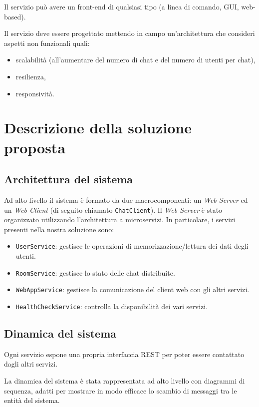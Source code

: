 \documentclass[a4paper]{article}
\begin{document}
Il servizio può avere un front-end di qualsiasi tipo (a linea di comando, GUI, web-based).

Il servizio deve essere progettato mettendo in campo un'architettura che consideri aspetti non funzionali quali:
\begin{itemize}
    \item scalabilità (all'aumentare del numero di chat e del numero di utenti per chat),
    \item resilienza,
    \item responsività.
\end{itemize}

\section{Descrizione della soluzione proposta}\label{soluzione-proposta}

\subsection{Architettura del sistema}\label{architettura-del-sistema}
Ad alto livello il sistema è formato da due macrocomponenti: un \textit{Web Server} ed un \textit{Web Client} (di seguito chiamato \texttt{ChatClient}). 
Il \textit{Web Server} è stato organizzato utilizzando l'architettura a microservizi. In particolare, i servizi presenti nella nostra soluzione sono:
\begin{itemize}
    \item \texttt{UserService}: gestisce le operazioni di memorizzazione/lettura dei dati degli utenti.
    \item \texttt{RoomService}: gestisce lo stato delle chat distribuite.
   \item \texttt{WebAppService}: gestisce la comunicazione del client web con gli altri servizi.
   \item \texttt{HealthCheckService}: controlla la disponibilità dei vari servizi.
\end{itemize}
 
\subsection{Dinamica del sistema}\label{dinamica-del-sistema}
Ogni servizio espone una propria interfaccia REST per poter essere contattato dagli altri servizi.

La dinamica del sistema è stata rappresentata ad alto livello con diagrammi di sequenza, adatti per mostrare in modo efficace lo scambio di messaggi tra le entità del sistema.
\end{document}

